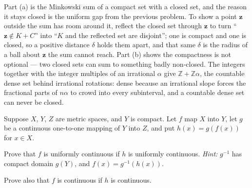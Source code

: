 \documentclass[main.tex]{subfiles}
\begin{document}
\begin{Reflection}
Part (a) is the Minkowski sum of a compact set with a closed set, and the reason it stays closed is the uniform gap from the previous problem. To show a point $\mathbf{z}$ outside the sum has room around it, reflect the closed set through $\mathbf{z}$ to turn ``$\mathbf{z} \notin K + C$'' into ``$K$ and the reflected set are disjoint''; one is compact and one is closed, so a positive distance $\delta$ holds them apart, and that same $\delta$ is the radius of a ball about $\mathbf{z}$ the sum cannot reach. Part (b) shows the compactness is not optional --- two closed sets can sum to something badly non-closed. The integers together with the integer multiples of an irrational $\alpha$ give $\mathbb{Z} + \mathbb{Z}\alpha$, the countable dense set behind irrational rotations: dense because an irrational slope forces the fractional parts of $n\alpha$ to crowd into every subinterval, and a countable dense set can never be closed.
\end{Reflection}

Suppose $X$, $Y$, $Z$ are metric spaces, and $Y$ is compact. Let $f$ map $X$ into $Y$, let $g$ be a continuous one-to-one mapping of $Y$ into $Z$, and put $h(x) = g(f(x))$ for $x \in X$.

Prove that $f$ is uniformly continuous if $h$ is uniformly continuous. \textit{Hint:} $g^{-1}$ has compact domain $g(Y)$, and $f(x) = g^{-1}(h(x))$.

Prove also that $f$ is continuous if $h$ is continuous.
\end{document}
